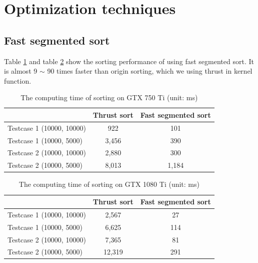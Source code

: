 \section{Optimization techniques}

\subsection{Fast segmented sort}
Table \ref{table:5_9} and table \ref{table:5_10} show the sorting performance of using fast segmented sort. It is almost 9 $\sim$ 90 times faster than origin sorting, which we using thrust in kernel function.
\begin{table}[h!]
\centering
\begin{tabular}{| l | c | c |} 
 \hline
  & Thrust sort & Fast segmented sort \\ [0.5ex] \hline
  Testcase 1 (10000, 10000) & 922 & 101\\ \hline
  Testcase 1 (10000, 5000) & 3,456 & 390\\ \hline
  Testcase 2 (10000, 10000) & 2,880 & 300\\ \hline
  Testcase 2 (10000, 5000) & 8,013 & 1,184\\ \hline
\end{tabular}
\caption{The computing time of sorting on GTX 750 Ti (unit: ms)}
\label{table:5_9}
\end{table}

\begin{table}[h!]
\centering
\begin{tabular}{| l | c | c |} 
 \hline
  & Thrust sort & Fast segmented sort \\ [0.5ex] \hline
  Testcase 1 (10000, 10000) & 2,567 & 27\\ \hline
  Testcase 1 (10000, 5000) & 6,625 & 114\\ \hline
  Testcase 2 (10000, 10000) & 7,365 & 81\\ \hline
  Testcase 2 (10000, 5000) & 12,319 & 291\\ \hline
\end{tabular}
\caption{The computing time of sorting on GTX 1080 Ti (unit: ms)}
\label{table:5_10}
\end{table}

